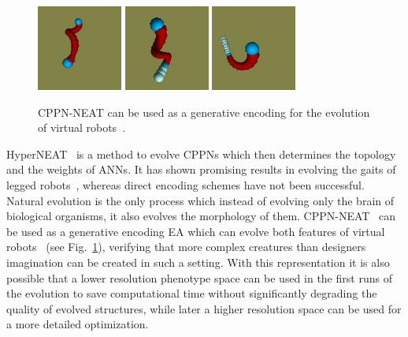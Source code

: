 \begin{figure}[b!]
\centering
\includegraphics[width=0.25\textwidth,height=0.2\textwidth]{../Figures/Misc/auerbach1.png}
\includegraphics[width=0.25\textwidth,height=0.2\textwidth]{../Figures/Misc/auerbach2.png}
\includegraphics[width=0.25\textwidth,height=0.2\textwidth]{../Figures/Misc/auerbach3.png}
\caption{CPPN-NEAT can be used as a generative encoding for the evolution of virtual robots~\citep{auerbach2010dynamic}.}
\label{fig:auerbach}
\end{figure}

HyperNEAT~\citep{stanley2009hypercube} is a method to evolve CPPNs which then determines the topology and the weights of ANNs. It has shown promising results in evolving the gaits of legged robots~\citep{clune2009evolving}, whereas direct encoding schemes have not been successful. Natural evolution is the only process which instead of evolving only the brain of biological organisms, it also evolves the morphology of them. CPPN-NEAT~\citep{stanley2007compositional} can be used as a generative encoding EA which can evolve both features of virtual robots~\citep{auerbach2010dynamic, auerbach2010evolving} (see Fig.~\ref{fig:auerbach}), verifying that more complex creatures than designers imagination can be created in such a setting. With this representation it is also possible that a lower resolution phenotype space can be used in the first runs of the evolution to save computational time without significantly degrading the quality of evolved structures, while later a higher resolution space can be used for a more detailed optimization.

